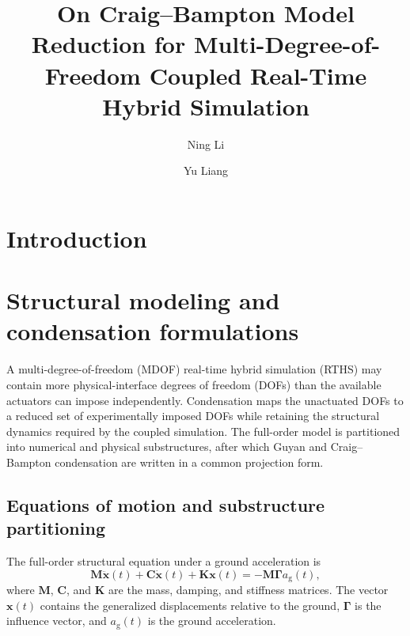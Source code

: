 \documentclass[11pt]{article}
\title{On Craig--Bampton Model Reduction for Multi-Degree-of-Freedom Coupled Real-Time Hybrid Simulation}
\author{Ning Li \and Yu Liang}
\date{}
\newenvironment{revision}{\begingroup\color{red}}{\endgroup}
\begin{document}
\maketitle

\begin{abstract}
\end{abstract}

\section{Introduction}

\section{Structural modeling and condensation formulations}\label{sec2}

\begin{revision}
A multi-degree-of-freedom (MDOF) real-time hybrid simulation (RTHS) may contain more physical-interface degrees of freedom (DOFs) than the available actuators can impose independently. Condensation maps the unactuated DOFs to a reduced set of experimentally imposed DOFs while retaining the structural dynamics required by the coupled simulation. The full-order model is partitioned into numerical and physical substructures, after which Guyan and Craig--Bampton condensation are written in a common projection form.
\end{revision}

\subsection{Equations of motion and substructure partitioning}

The full-order structural equation under a ground acceleration is
\begin{equation}
    \mathbf{M}\ddot{\bm{x}}(t)+\mathbf{C}\dot{\bm{x}}(t)+\mathbf{K}\bm{x}(t)
    =-\mathbf{M}\bm{\Gamma}a_{\mathrm{g}}(t),
    \label{eq:full-order-eom}
\end{equation}
where \(\mathbf{M}\), \(\mathbf{C}\), and \(\mathbf{K}\) are the mass, damping, and stiffness matrices. The vector \(\bm{x}(t)\) contains the generalized displacements relative to the ground, \(\bm{\Gamma}\) is the influence vector, and \(a_{\mathrm{g}}(t)\) is the ground acceleration.
\end{document}
